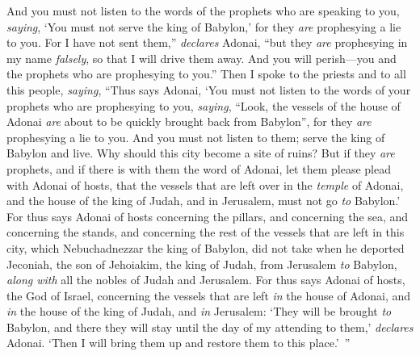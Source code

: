 \begin{biblechapter}
\verse And you must not listen to the words of the prophets who are speaking to you, \textit{saying}, ‘You must not serve the king of Babylon,’ for they \textit{are} prophesying a lie to you.
\verse For I have not sent them,” \textit{declares} Adonai, “but they \textit{are} prophesying in my name \textit{falsely}, so that I will drive them away. And you will perish—you and the prophets who are prophesying to you.”
 Then I spoke to the priests and to all this people, \textit{saying}, “Thus says Adonai, ‘You must not listen to the words of your prophets who are prophesying to you, \textit{saying}, “Look, the vessels of the house of Adonai \textit{are} about to be quickly brought back from Babylon”, for they \textit{are} prophesying a lie to you.
\verse And you must not listen to them; serve the king of Babylon and live. Why should this city become a site of ruins?
\verse But if they \textit{are} prophets, and if there is with them the word of Adonai, let them please plead with Adonai of hosts, that the vessels that are left over in the \textit{temple} of Adonai, and the house of the king of Judah, and in Jerusalem, must not go \textit{to} Babylon.’
\verse For thus says Adonai of hosts concerning the pillars, and concerning the sea, and concerning the stands, and concerning the rest of the vessels that are left in this city,
\verse which Nebuchadnezzar the king of Babylon, did not take when he deported Jeconiah, the son of Jehoiakim, the king of Judah, from Jerusalem \textit{to} Babylon, \textit{along with} all the nobles of Judah and Jerusalem.
\verse For thus says Adonai of hosts, the God of Israel, concerning the vessels that are left \textit{in} the house of Adonai, and \textit{in} the house of the king of Judah, and \textit{in} Jerusalem:
\verse ‘They will be brought \textit{to} Babylon, and there they will stay until the day of my attending to them,’ \textit{declares} Adonai. ‘Then I will bring them up and restore them to this place.’ ”
\end{biblechapter}

